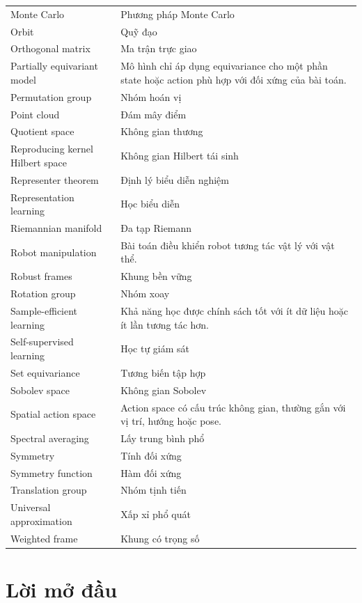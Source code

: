 \documentclass[oneside]{hcmus-report}
\theoremstyle{plain}
\theoremstyle{definition}
\begin{document}
\begin{longtable}{p{} p{}}
Monte Carlo & Phương pháp Monte Carlo \\
Orbit & Quỹ đạo \\
Orthogonal matrix & Ma trận trực giao \\
Partially equivariant model & Mô hình chỉ áp dụng equivariance cho một phần state hoặc action phù hợp với đối xứng của bài toán.\\
Permutation group & Nhóm hoán vị \\
Point cloud & Đám mây điểm \\
Quotient space & Không gian thương \\
Reproducing kernel Hilbert space & Không gian Hilbert tái sinh \\
Representer theorem & Định lý biểu diễn nghiệm \\
Representation learning & Học biểu diễn \\
Riemannian manifold & Đa tạp Riemann \\
Robot manipulation & Bài toán điều khiển robot tương tác vật lý với vật thể.\\
Robust frames & Khung bền vững \\
Rotation group & Nhóm xoay \\
Sample-efficient learning & Khả năng học được chính sách tốt với ít dữ liệu hoặc ít lần tương tác hơn.\\
Self-supervised learning & Học tự giám sát \\
Set equivariance & Tương biến tập hợp \\
Sobolev space & Không gian Sobolev \\
Spatial action space & Action space có cấu trúc không gian, thường gắn với vị trí, hướng hoặc pose.\\
Spectral averaging & Lấy trung bình phổ \\
Symmetry & Tính đối xứng \\
Symmetry function & Hàm đối xứng \\
Translation group & Nhóm tịnh tiến \\
Universal approximation & Xấp xỉ phổ quát \\
Weighted frame & Khung có trọng số \\

\end{longtable}

\clearpage

\section*{Lời mở đầu}
\end{document}
